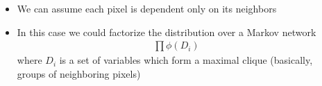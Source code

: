 \begin{frame}
\begin{columns}
\begin{overlayarea}{\textwidth}{\textheight}
		\end{overlayarea}
		\begin{overlayarea}{\textwidth}{\textheight}
			\begin{itemize}\justifying
			\item<1->We can assume each pixel is dependent only on its neighbors
			\item<2-> In this case we could factorize the distribution over a Markov network 
			\begin{align*}
			\prod \phi(D_i)
			\end{align*}
			 where $D_i$ is a set of variables which form a maximal clique (basically, groups of neighboring pixels)
			\end{itemize}
		\end{overlayarea}
	\end{columns}
\end{frame}

